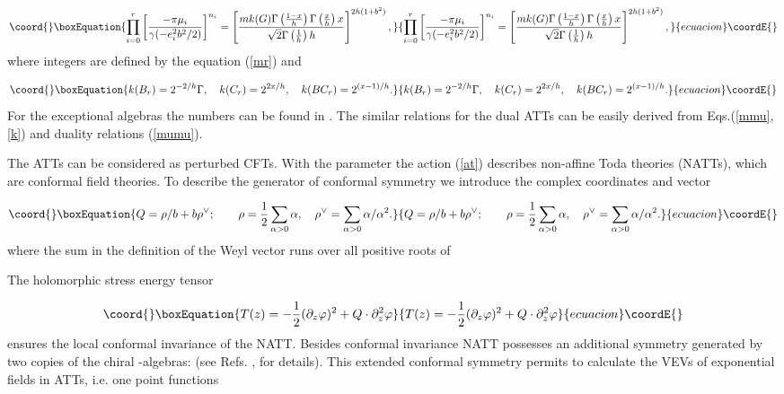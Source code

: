 \documentclass[a4paper,12pt,titlepage,final]{article}
\begin{document}
\begin{equation}\coord{}\boxEquation{
\prod_{i=0}^{r}\left[ \frac{-\pi \mu _{i}}{\gamma
(-e_{i}^{2}b^{2}/2)}\right]
^{n_{i}}=\left[ \frac{mk(G)\Gamma \left( \frac{1-x}{h}\right) \Gamma \left(
\frac{x}{h}\right) x}{\sqrt{2}\Gamma \left( \frac{1}{h}\right) h}\right]
^{2h(1+b^{2})},  \label{mmu}
}{
\prod_{i=0}^{r}\left[ \frac{-\pi \mu _{i}}{\gamma
(-e_{i}^{2}b^{2}/2)}\right]
^{n_{i}}=\left[ \frac{mk(G)\Gamma \left( \frac{1-x}{h}\right) \Gamma \left(
\frac{x}{h}\right) x}{\sqrt{2}\Gamma \left( \frac{1}{h}\right) h}\right]
^{2h(1+b^{2})},  }{ecuacion}\coordE{}\end{equation}
where integers \coordHE{} are defined by the equation (\ref{mr}) and

\begin{equation}\coord{}\boxEquation{
k(B_{r})=2^{-2/h}\Gamma ,\quad k(C_{r})=2^{2x/h},\quad
k(BC_{r})=2^{(x-1)/h}.
\label{k}
}{
k(B_{r})=2^{-2/h}\Gamma ,\quad k(C_{r})=2^{2x/h},\quad
k(BC_{r})=2^{(x-1)/h}.
}{ecuacion}\coordE{}\end{equation}
For the exceptional algebras \coordHE{} the numbers \coordHE{} can be found in \cite
{ABF}. The similar relations for the dual ATTs can be easily derived from
Eqs.(\ref{mmu},\ref{k}) and duality relations (\ref{mumu}).

The ATTs can be considered as perturbed CFTs. With the parameter
\coordHE{} the action (\ref{at}) describes non-affine Toda theories
(NATTs), which are conformal field theories. To describe the generator
of conformal symmetry we introduce the complex coordinates
\coordHE{} and vector

\begin{equation}\coord{}\boxEquation{
Q=\rho /b+b\rho ^{\vee };\qquad \rho =\frac{1}{2}\sum_{\alpha >0}\alpha
,\quad \rho ^{\vee }=\sum_{\alpha >0}\alpha /\alpha^{2}. 
\label{q}
}{
Q=\rho /b+b\rho ^{\vee };\qquad \rho =\frac{1}{2}\sum_{\alpha >0}\alpha
,\quad \rho ^{\vee }=\sum_{\alpha >0}\alpha /\alpha^{2}. 
}{ecuacion}\coordE{}\end{equation}
where the sum in the definition of the Weyl vector \myHighlight{$\rho $}\coordHE{} runs over all
positive roots \myHighlight{$\alpha $}\coordHE{} of \coordHE{}

The holomorphic stress energy tensor

\begin{equation}\coord{}\boxEquation{
T(z)=-\frac{1}{2}(\partial _{z}\varphi )^{2}+Q\cdot \partial _{z}^{2}\varphi
\label{se}
}{
T(z)=-\frac{1}{2}(\partial _{z}\varphi )^{2}+Q\cdot \partial _{z}^{2}\varphi
}{ecuacion}\coordE{}\end{equation}
ensures the local conformal invariance of the NATT. Besides conformal
invariance NATT possesses an additional symmetry generated by two copies of
the chiral \coordHE{}-algebras: \coordHE{}  \coordHE{} (see Refs.
\cite
{FL},\cite{VFT} for details). This extended conformal symmetry permits to
calculate the VEVs of exponential fields in ATTs, i.e. one point functions
\end{document}
